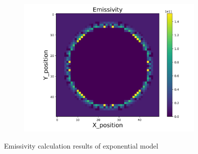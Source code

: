 \begin{figure}[p]
\begin{minipage}{\textwidth}
\begin{subfigure}{0.325\textwidth}
            \centering
            \includegraphics[width=\textwidth]{figures/raw_data/33/exp/emi_cal.jpg}
        \end{subfigure}
    \end{minipage}
    \caption{Emissivity calculation results of exponential model}  
\end{figure}


\newpage
